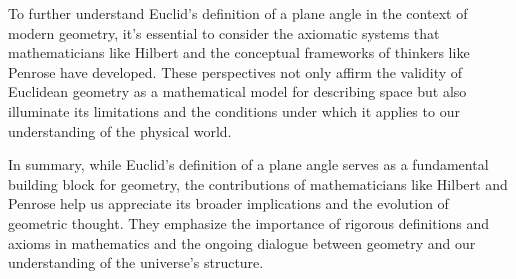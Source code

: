 To further understand Euclid's definition of a plane angle in the context of modern geometry, it's essential to consider the axiomatic systems that mathematicians like Hilbert and the conceptual frameworks of thinkers like Penrose have developed. These perspectives not only affirm the validity of Euclidean geometry as a mathematical model for describing space but also illuminate its limitations and the conditions under which it applies to our understanding of the physical world.

In summary, while Euclid's definition of a plane angle serves as a fundamental building block for geometry, the contributions of mathematicians like Hilbert and Penrose help us appreciate its broader implications and the evolution of geometric thought. They emphasize the importance of rigorous definitions and axioms in mathematics and the ongoing dialogue between geometry and our understanding of the universe's structure.

\clearpage